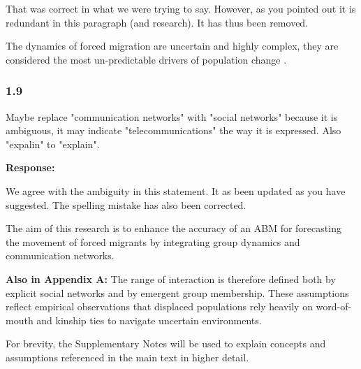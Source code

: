 \documentclass[11pt,a4paper]{article}
\begin{document}
That was correct in what we were trying to say. However, as you pointed out it is redundant in this paragraph (and research). It has thus been removed.

\vspace{0.5cm}


\begin{updatebox}

The dynamics of forced migration are uncertain and highly complex, they are considered the most un-predictable
 drivers of population change    \citep{NRC2000}.

\end{updatebox}

\vspace{0.5cm}

\subsubsection*{1.9}

\begin{reviewbox}
Maybe replace "communication networks" with "social networks" because it is ambiguous, it may indicate "telecommunications" the way it is expressed.
Also "expalin" to "explain".
\end{reviewbox}

\textbf{Response:}

We agree with the ambiguity in this statement. It as been updated as you have suggested. The spelling mistake has also been corrected.

\vspace{0.5cm}

\begin{updatebox}

    The aim of this research is to enhance the accuracy of an ABM for forecasting the movement of forced migrants by 
integrating group dynamics and communication networks.

    \medbreak

    \textbf{Also in Appendix A:} The range of interaction is therefore defined both by explicit social networks and by emergent group 
membership. These assumptions reflect empirical observations that displaced populations rely heavily on word-of-mouth 
and kinship ties to navigate uncertain environments.

    \medbreak

    For brevity, the Supplementary Notes will be used to explain concepts and 
assumptions referenced in the main text in higher detail.

\end{updatebox}
\end{document}
